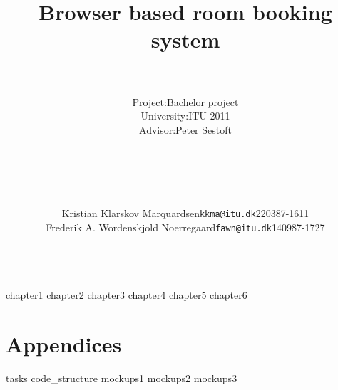 \documentclass[12pt,a4paper]{report}
\begin{document}

\title{\Huge{\textsf{\textbf{Browser based room booking system}}}}
\author{
		\hline \\
		\begin{tabular}{ l l }
		Project: & Bachelor project \\
		University: & ITU 2011 \\
		Advisor: & Peter Sestoft\\
		\end{tabular}\\
		\mbox{} \\
		\hline \\
		\mbox{}\\
		\begin{tabular} { l l l }
				Kristian Klarskov Marquardsen & \texttt{kkma@itu.dk} &220387-1611\\
				Frederik A. Wordenskjold Noerregaard & \texttt{fawn@itu.dk} & 140987-1727\\
		\end{tabular}\\
		\mbox{}}
\date{}
\maketitle

\tableofcontents

{chapter1}
{chapter2}
{chapter3}
{chapter4}
{chapter5}
{chapter6}


\appendix
\chapter{Appendices}
{tasks}
{code_structure}
{mockups1}
{mockups2}
{mockups3}
\end{document}
